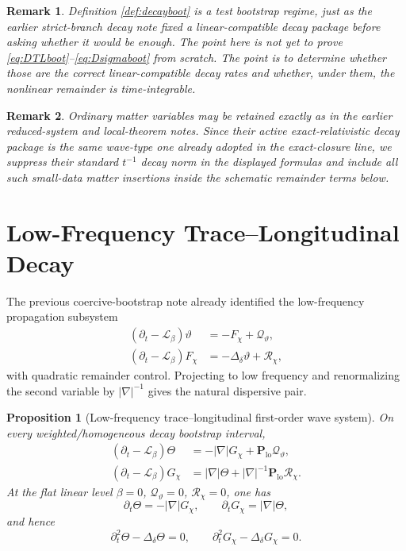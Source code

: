 \documentclass[11pt]{article}
\newcommand{\Ell}{\mathcal{L}}
\newtheorem{proposition}{Proposition}
\newtheorem{remark}{Remark}
\begin{document}
\begin{remark}
Definition \ref{def:decayboot} is a \emph{test} bootstrap regime, just as the earlier strict-branch decay note fixed a linear-compatible decay package before asking whether it would be enough. The point here is not yet to prove \eqref{eq:DTLboot}--\eqref{eq:Dsigmaboot} from scratch. The point is to determine whether those are the correct linear-compatible decay rates and whether, under them, the nonlinear remainder is time-integrable.
\end{remark}

\begin{remark}
Ordinary matter variables may be retained exactly as in the earlier reduced-system and local-theorem notes. Since their active exact-relativistic decay package is the same wave-type one already adopted in the exact-closure line, we suppress their standard \(t^{-1}\) decay norm in the displayed formulas and include all such small-data matter insertions inside the schematic remainder terms below.
\end{remark}

\section{Low-Frequency Trace--Longitudinal Decay}

The previous coercive-bootstrap note already identified the low-frequency propagation subsystem
\begin{align}
(\partial_t-\Ell_\beta)\vartheta
&=
-F_\chi+\mathcal Q_\vartheta,
\label{eq:varthetadt}
\\
(\partial_t-\Ell_\beta)F_\chi
&=
-\Delta_\delta\vartheta+\mathcal R_\chi,
\label{eq:Fdt}
\end{align}
with quadratic remainder control. Projecting to low frequency and renormalizing the second variable by \(|\nabla|^{-1}\) gives the natural dispersive pair.

\begin{proposition}[Low-frequency trace--longitudinal first-order wave system]
\label{prop:TLwave}
On every weighted/homogeneous decay bootstrap interval,
\begin{align}
(\partial_t-\Ell_\beta)\Theta
&=
-|\nabla|G_\chi + \mathbf P_{\mathrm{lo}}\mathcal Q_\vartheta,
\label{eq:Thetadt}
\\
(\partial_t-\Ell_\beta)G_\chi
&=
|\nabla|\Theta + |\nabla|^{-1}\mathbf P_{\mathrm{lo}}\mathcal R_\chi.
\label{eq:Gdt}
\end{align}
At the flat linear level \(\beta=0\), \(\mathcal Q_\vartheta=0\), \(\mathcal R_\chi=0\), one has
\begin{equation}
\partial_t\Theta = -|\nabla|G_\chi,
\qquad
\partial_tG_\chi = |\nabla|\Theta,
\label{eq:linearTL}
\end{equation}
and hence
\begin{equation}
\partial_t^2\Theta-\Delta_\delta\Theta = 0,
\qquad
\partial_t^2G_\chi-\Delta_\delta G_\chi = 0.
\label{eq:TLwave2}
\end{equation}
\end{proposition}
\end{document}
